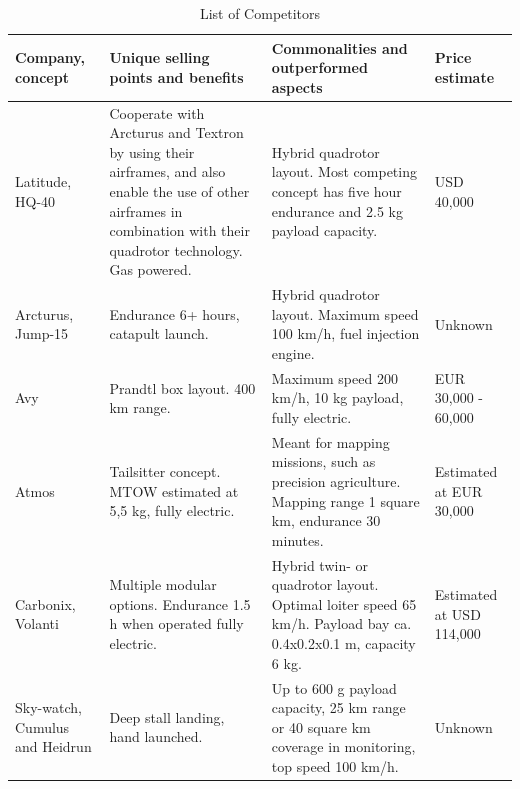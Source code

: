 \begin{table}[hbt]
    \centering
    \caption{List of Competitors}
    \label{tab:list_comp}
    \begin{tabularx}{\textwidth}{>{\small}p{} L  L >{\small}p{.12\textwidth} }
    \toprule
    \textbf{Company, concept}     & \textbf{Unique selling points and benefits} & \textbf{Commonalities and outperformed aspects}  &\textbf{Price estimate} 
    \\ \midrule
    Latitude, HQ-40\footnotemark    & Cooperate with Arcturus and Textron by using their airframes, and also enable the use of other airframes in combination with their quadrotor technology. Gas powered. & Hybrid quadrotor layout. Most competing concept has five hour endurance and 2.5 kg payload capacity. & USD 40,000\footnotemark
    \\ \hdashline
    Arcturus, Jump-15\footnotemark & Endurance 6+ hours, catapult launch. & Hybrid quadrotor layout. Maximum speed 100 km/h, fuel injection engine. & Unknown
    \\ \hdashline
    Avy         & Prandtl box layout. 400 km range. & Maximum speed 200 km/h, 10 kg payload, fully electric\footnotemark. & EUR 30,000 - 60,000\footnotemark
    \\ \hdashline
    Atmos       & Tailsitter concept. MTOW estimated at 5,5 kg\footnotemark, fully electric. & Meant for mapping missions, such as precision agriculture. Mapping range 1 square km, endurance 30 minutes. & Estimated at EUR 30,000
    \\ \hdashline
    Carbonix, Volanti\footnotemark    & Multiple modular options. Endurance 1.5 h when operated fully electric.& Hybrid twin- or quadrotor layout. Optimal loiter speed 65 km/h. Payload bay ca. 0.4x0.2x0.1 m, capacity 6 kg. & Estimated at USD 114,000\footnotemark
    \\ \hdashline
    Sky-watch, Cumulus and Heidrun\footnotemark   & Deep stall landing, hand launched.  & Up to 600 g payload capacity, 25 km range or 40 square km coverage in monitoring, top speed 100 km/h. & Unknown
    \\ \bottomrule
    \end{tabularx}
\end{table}

